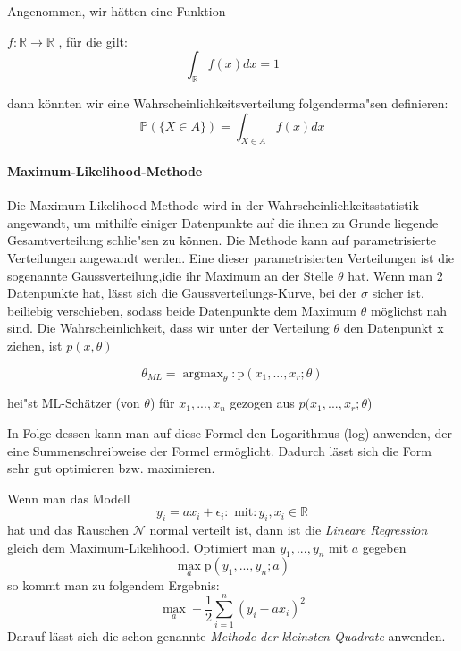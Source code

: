 Angenommen, wir h\"atten eine Funktion
\vspace{3pt}

$f: \mathbb{R} \rightarrow \mathbb{R}$ , f\"ur die gilt: 
\begin{equation*}
\int_{\mathbb{R}} f(x) dx = 1
\end{equation*}

\vspace{3pt}

dann k\"onnten wir eine Wahrscheinlichkeitsverteilung folgenderma"sen definieren:
\begin{equation*}
\mathbb{P} (\{X\in A\}) = \int_{X \in A} f(x) dx
\end{equation*}

\paragraph {Maximum-Likelihood-Methode}

Die Maximum-Likelihood-Methode wird in der Wahrscheinlichkeitsstatistik angewandt, um mithilfe einiger Datenpunkte auf die ihnen zu Grunde liegende Gesamtverteilung schlie"sen zu k\"onnen.
Die Methode kann auf parametrisierte Verteilungen angewandt werden. Eine dieser parametrisierten Verteilungen ist die sogenannte Gaussverteilung,idie ihr Maximum an der Stelle $\theta$ hat. Wenn man $2$ Datenpunkte hat, l\"asst sich die Gaussverteilungs-Kurve, bei der $\sigma$ sicher ist, beiliebig verschieben, sodass beide Datenpunkte dem Maximum $\theta$ m\"oglichst nah sind.
Die Wahrscheinlichkeit, dass wir unter der Verteilung $\theta$ den Datenpunkt x ziehen, ist $p(x,\theta)$

\begin{equation*}
\theta_{ML} = \operatorname{argmax}_{\theta} : \text{p} (x_{1},...,x_{r};\theta)
\end{equation*}

hei"st ML-Sch\"atzer (von $\theta$) für $x_{1},...,x_{n}$ gezogen aus $p(x_{1},...,x_{r};\theta$)

In Folge dessen kann man auf diese Formel den Logarithmus (log) anwenden, der eine Summenschreibweise der Formel erm\"oglicht. Dadurch l\"asst sich die Form sehr gut optimieren bzw. maximieren. 


\vspace{5pt}

Wenn man das Modell
\begin{equation*} 
y_{i} = ax_{i}+\epsilon_{i} : \text{ mit} : y_{i}, x_{i} \in \mathbb{R}
\end{equation*}
hat und das Rauschen $\mathcal{N}$ normal verteilt ist, dann ist die \textit{Lineare Regression} gleich dem Maximum-Likelihood. Optimiert man $y_{1},...,y_{n}$ mit $a$ gegeben
\begin{equation*} 
\operatorname{max}_{a} \text{p} (y_{1},...,y_{n};a)
\end{equation*}
so kommt man zu folgendem Ergebnis:
\begin{equation*}
\operatorname{max}_{a} -\frac{1}{2} \sum_{i=1}^{n} (y_{i} -ax_{i})^{2}
\end{equation*}
Darauf l\"asst sich die schon genannte \textit{Methode der kleinsten Quadrate} anwenden.